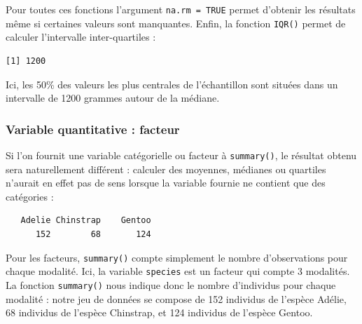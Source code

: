 \documentclass[
  a4paper,
  DIV=11,
  numbers=noendperiod,
  oneside]{scrreprt}
\newenvironment{Shaded}{}{}
\newcommand{\AttributeTok}[1]{\textcolor[rgb]{0.84,0.23,0.29}{#1}}
\newcommand{\ConstantTok}[1]{\textcolor[rgb]{0.00,0.36,0.77}{#1}}
\newcommand{\FunctionTok}[1]{\textcolor[rgb]{0.44,0.26,0.76}{#1}}
\newcommand{\NormalTok}[1]{\textcolor[rgb]{0.14,0.16,0.18}{#1}}
\newcommand{\SpecialCharTok}[1]{\textcolor[rgb]{0.00,0.36,0.77}{#1}}
\begin{document}
Pour toutes ces fonctions l'argument \texttt{na.rm\ =\ TRUE} permet
d'obtenir les résultats même si certaines valeurs sont manquantes.
Enfin, la fonction \texttt{IQR()} permet de calculer l'intervalle
inter-quartiles :

\begin{Shaded}
\end{Shaded}

\begin{verbatim}
[1] 1200
\end{verbatim}

Ici, les 50\% des valeurs les plus centrales de l'échantillon sont
situées dans un intervalle de 1200 grammes autour de la médiane.

\hypertarget{variable-quantitative-facteur}{%
\subsubsection{Variable quantitative :
facteur}\label{variable-quantitative-facteur}}

Si l'on fournit une variable catégorielle ou facteur à
\texttt{summary()}, le résultat obtenu sera naturellement différent :
calculer des moyennes, médianes ou quartiles n'aurait en effet pas de
sens lorsque la variable fournie ne contient que des catégories :

\begin{Shaded}
\end{Shaded}

\begin{verbatim}
   Adelie Chinstrap    Gentoo 
      152        68       124 
\end{verbatim}

Pour les facteurs, \texttt{summary()} compte simplement le nombre
d'observations pour chaque modalité. Ici, la variable \texttt{species}
est un facteur qui compte 3 modalités. La fonction \texttt{summary()}
nous indique donc le nombre d'individus pour chaque modalité : notre jeu
de données se compose de 152 individus de l'espèce Adélie, 68 individus
de l'espèce Chinstrap, et 124 individus de l'espèce Gentoo.
\end{document}
